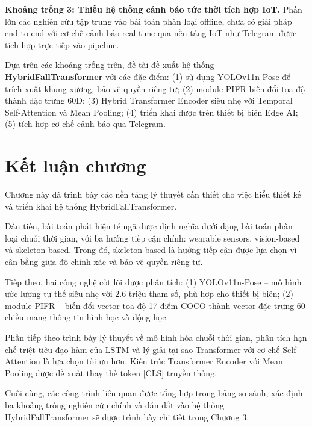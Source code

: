 \textbf{Khoảng trống 3: Thiếu hệ thống cảnh báo tức thời tích hợp IoT.} Phần lớn các nghiên cứu tập trung vào bài toán phân loại offline, chưa có giải pháp end-to-end với cơ chế cảnh báo real-time qua nền tảng IoT như Telegram được tích hợp trực tiếp vào pipeline.

Dựa trên các khoảng trống trên, đề tài đề xuất hệ thống \textbf{HybridFallTransformer} với các đặc điểm: (1) sử dụng YOLOv11n-Pose để trích xuất khung xương, bảo vệ quyền riêng tư; (2) module PIFR biến đổi tọa độ thành đặc trưng 60D; (3) Hybrid Transformer Encoder siêu nhẹ với Temporal Self-Attention và Mean Pooling; (4) triển khai được trên thiết bị biên Edge AI; (5) tích hợp cơ chế cảnh báo qua Telegram.


\section{Kết luận chương}
\label{sec:chapter_summary}

Chương này đã trình bày các nền tảng lý thuyết cần thiết cho việc hiểu thiết kế và triển khai hệ thống HybridFallTransformer.

Đầu tiên, bài toán phát hiện té ngã được định nghĩa dưới dạng bài toán phân loại chuỗi thời gian, với ba hướng tiếp cận chính: wearable sensors, vision-based và skeleton-based. Trong đó, skeleton-based là hướng tiếp cận được lựa chọn vì cân bằng giữa độ chính xác và bảo vệ quyền riêng tư.

Tiếp theo, hai công nghệ cốt lõi được phân tích: (1) YOLOv11n-Pose -- mô hình ước lượng tư thế siêu nhẹ với 2.6 triệu tham số, phù hợp cho thiết bị biên; (2) module PIFR -- biến đổi vector tọa độ 17 điểm COCO thành vector đặc trưng 60 chiều mang thông tin hình học và động học.

Phần tiếp theo trình bày lý thuyết về mô hình hóa chuỗi thời gian, phân tích hạn chế triệt tiêu đạo hàm của LSTM và lý giải tại sao Transformer với cơ chế Self-Attention là lựa chọn tối ưu hơn. Kiến trúc Transformer Encoder với Mean Pooling được đề xuất thay thế token [CLS] truyền thống.

Cuối cùng, các công trình liên quan được tổng hợp trong bảng so sánh, xác định ba khoảng trống nghiên cứu chính và dẫn dắt vào hệ thống HybridFallTransformer sẽ được trình bày chi tiết trong Chương 3.

